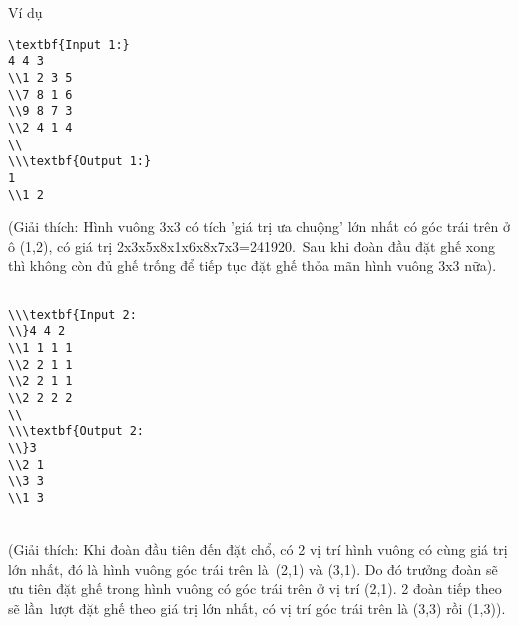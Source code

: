 Ví dụ  
\begin{verbatim}
\textbf{Input 1:}
4 4 3
\\1 2 3 5
\\7 8 1 6
\\9 8 7 3
\\2 4 1 4
\\
\\\textbf{Output 1:}
1
\\1 2\end{verbatim}

   (Giải thích: Hình vuông 3x3 có tích 'giá trị ưa chuộng' lớn nhất có góc trái trên ở ô (1,2), có giá trị 2x3x5x8x1x6x8x7x3=241920. Sau khi đoàn đầu đặt ghế xong thì không còn đủ ghế trống để tiếp tục đặt ghế thỏa mãn hình vuông 3x3 nữa).  
\begin{verbatim}

\\\textbf{Input 2:
\\}4 4 2
\\1 1 1 1
\\2 2 1 1
\\2 2 1 1
\\2 2 2 2
\\
\\\textbf{Output 2:
\\}3
\\2 1
\\3 3
\\1 3\end{verbatim}


\\   (Giải thích: Khi đoàn đầu tiên đến đặt chổ, có 2 vị trí hình vuông có cùng giá trị lớn nhất, đó là hình vuông góc trái trên là (2,1) và (3,1). Do đó trưởng đoàn sẽ ưu tiên đặt ghế trong hình vuông có góc trái trên ở vị trí (2,1). 2 đoàn tiếp theo sẽ lần lượt đặt ghế theo giá trị lớn nhất, có vị trí góc trái trên là (3,3) rồi (1,3)).